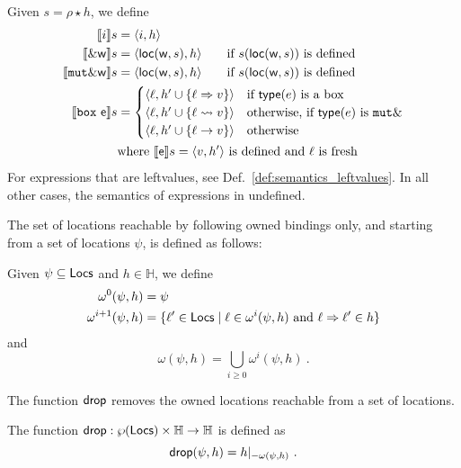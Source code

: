 \begin{definition}\label{def:semantics_expressions}
  Given $s=\rho\star h$, we define
  \begin{align*}
    \den[i]{s}&=\langle i,h\rangle\\
    \den[\borrow\mathsf{w}]{s}&=\langle\loc(\mathsf{w},s),h\rangle\qquad\text{if $s(\loc(\mathsf{w},s))$ is defined}\\
    \den[\mathtt{mut}\borrow\mathsf{w}]{s}&=\langle\loc(\mathsf{w},s),h\rangle\qquad\text{if $s(\loc(\mathsf{w},s))$ is defined}\\
    \den[\mathtt{box}\ \mathsf{e}]{s}&=
    \begin{cases}
      \langle\ell,h'\cup\{\ell\Rightarrow v\}\rangle & \text{if $\type(e)$ is a box}\\
      \langle\ell,h'\cup\{\ell\leadsto v\}\rangle & \text{otherwise, if $\type(e)$ is $\mathtt{mut}\borrow$}\\
      \langle\ell,h'\cup\{\ell\to v\}\rangle & \text{otherwise}
    \end{cases}\\
    & \text{where $\den[\mathsf{e}]{s}=\langle v, h'\rangle$ is defined and $\ell$ is fresh}
  \end{align*}
  For expressions that are leftvalues, see Def.~\ref{def:semantics_leftvalues}.
  In all other cases, the semantics of expressions in undefined.
\end{definition}

The set of locations reachable by following owned bindings only, and starting from a set of locations $\psi$,
is defined as follows:
%
\begin{definition}
  Given $\psi\subseteq\Locs$ and $h\in\mathbb{H}$, we define
  \begin{align*}
  \omega^0(\psi,h)&=\psi\\ %
  \omega^{i+1}(\psi,h)&=\{\ell'\in\Locs\mid\ell\in\omega^i(\psi,h)\text{ and }\ell\Rightarrow\ell'\in h\}
  \end{align*}
  and
  \[
  \omega(\psi,h)=\bigcup\limits_{i\ge 0}\omega^i(\psi,h)~.
  \]
\end{definition}

The function $\drop$ removes the owned locations reachable from a set of locations.
%
\begin{definition}[Drop]\label{def:drop}
  The function $\drop:\wp(\Locs)\times\mathbb{H}\to\mathbb{H}$ is defined as
  \[
  \drop(\psi,h)=h|_{-{\omega(\psi,h)}}~.
  \]
\end{definition}

